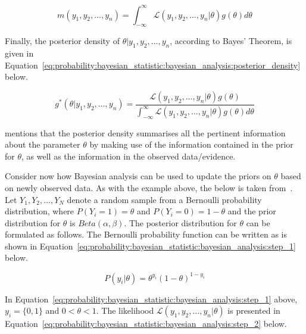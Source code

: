 \begin{equation}
      \label{eq:probability:bayesian_statistic:bayesian_analysis:marginal_density}
      m(y_{1}, y_{2}, \dots, y_{n}) = \int_{-\infty}^{\infty} \mathcal{L}(y_{1}, y_{2}, \dots, y_{n} \vert \theta)g(\theta)d\theta
\end{equation}

Finally, the posterior density of $\theta \vert y_{1}, y_{2}, \dots, y_{n}$, according to Bayes' Theorem, is given in Equation~\eqref{eq:probability:bayesian_statistic:bayesian_analysis:posterior_density} below.

\begin{equation}
      \label{eq:probability:bayesian_statistic:bayesian_analysis:posterior_density}
      g^{*}(\theta \vert y_{1}, y_{2}, \dots, y_{n}) = \frac{\mathcal{L}(y_{1}, y_{2}, \dots, y_{n} \vert \theta)g(\theta)}{\int_{-\infty}^{\infty} \mathcal{L}(y_{1}, y_{2}, \dots, y_{n} \vert \theta)g(\theta)d\theta}
\end{equation}

\citeauthor{ref:wackerly:2014}\cite{ref:wackerly:2014} mentions that the posterior density summarises all the pertinent information about the parameter $\theta$ by making use of the information contained in the prior for $\theta$, as well as the information in the observed data/evidence.

Consider now how Bayesian analysis can be used to update the priors on $\theta$ based on newly observed data. As with the example above, the below is taken from~\cite{ref:wackerly:2014}. Let $Y_{1}, Y_{2}, \dots, Y_{N}$ denote a random sample from a Bernoulli probability distribution, where $P(Y_{i} = 1) = \theta$ and $P(Y_{i} = 0) = 1 - \theta$ and the prior distribution for $\theta$ is $Beta(\alpha, \beta)$. The posterior distribution for $\theta$ can be formulated as follows. The Bernoulli probability function can be written as is shown in Equation~\eqref{eq:probability:bayesian_statistic:bayesian_analysis:step_1} below.

\begin{equation}
      \label{eq:probability:bayesian_statistic:bayesian_analysis:step_1}
      P(y_{i} \vert \theta) = \theta^{y_{i}}(1 - \theta)^{1-y_{i}}
\end{equation}

In Equation~\eqref{eq:probability:bayesian_statistic:bayesian_analysis:step_1} above, $y_{i} = \{0,1\}$ and $0 < \theta < 1$. The likelihood $\mathcal{L}(y_{1}, y_{2}, \dots, y_{n} \vert \theta)$ is presented in Equation~\eqref{eq:probability:bayesian_statistic:bayesian_analysis:step_2} below.

